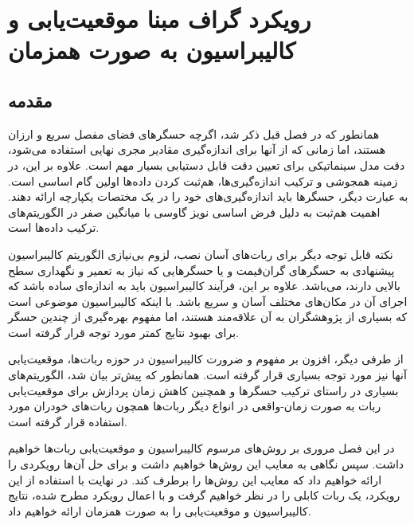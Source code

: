 \chapter{رویکرد گراف مبنا موقعیت‌یابی و کالیبراسیون به صورت همزمان}

\section{مقدمه}
همانطور که در فصل قبل ذکر شد، اگرچه حسگرهای فضای مفصل سریع و ارزان هستند، اما زمانی که از آنها برای اندازه‌گیری مقادیر مجری نهایی استفاده می‌شود، دقت مدل سینماتیکی برای تعیین دقت قابل دستیابی بسیار مهم است. علاوه بر این، در زمینه همجوشی و ترکیب اندازه‌گیری‌ها، هم‌ثبت کردن داده‌ها
\cite{hall1997introduction} 
 اولین گام اساسی است. به عبارت دیگر، حسگرها باید اندازه‌گیری‌های خود را در یک مختصات یکپارچه ارائه دهند. اهمیت هم‌ثبت به دلیل فرض اساسی نویز گاوسی با میانگین صفر در الگوریتم‌های ترکیب داده‌ها است.
 
 نکته قابل توجه دیگر برای ربات‌های آسان نصب، لزوم بی‌نیازی الگوریتم کالیبراسیون پیشنهادی به حسگرهای گران‌قیمت و یا حسگرهایی که نیاز به تعمیر و نگهداری سطح بالایی دارند، می‌باشد. علاوه بر این، فرآیند کالیبراسیون باید به اندازه‌ای ساده باشد که اجرای آن در مکان‌های مختلف آسان و سریع باشد. با اینکه کالیبراسیون موضوعی است که بسیاری از پژوهشگران به آن علاقه‌مند هستند، اما مفهوم بهره‌گیری از چندین حسگر برای بهبود نتایج کمتر مورد توجه قرار گرفته است.
 

از طرفی دیگر، افزون بر مفهوم و ضرورت کالیبراسیون در حوزه ربات‌ها، موقعیت‌یابی آنها نیز مورد توجه بسیاری قرار گرفته است. همانطور که پیش‌تر بیان شد، الگوریتم‌های بسیاری در راستای ترکیب حسگرها و همچنین کاهش زمان پردازش برای موقعیت‌یابی ربات به صورت زمان-واقعی در انواع دیگر ربات‌ها همچون ربات‌های خودران مورد استفاده قرار گرفته است.

در این فصل مروری بر روش‌های مرسوم کالیبراسیون و موقعیت‌یابی ربات‌ها خواهیم داشت. سپس نگاهی به معایب این روش‌ها خواهیم داشت و برای حل آن‌ها رویکردی را ارائه خواهیم داد که معایب این روش‌ها را برطرف کند. در نهایت با استفاده از این رویکرد، یک ربات کابلی را در نظر خواهیم گرفت و با اعمال رویکرد مطرح شده، نتایج کالیبراسیون و موقعیت‌یابی را به صورت همزمان ارائه خواهیم داد.

